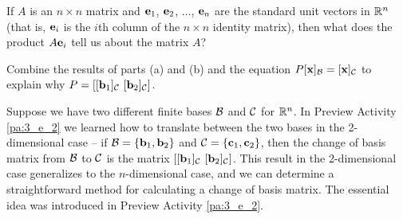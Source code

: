 \begin{pa}
	\item If $A$ is an $n \times n$ matrix and $\mathbf{e}_1$, $\mathbf{e}_2$, $\ldots$, $\mathbf{e}_n$ are the standard unit vectors in $\mathbb{R}^n$ (that is, $\mathbf{e}_i$ is the $i$th column of the $n \times n$ identity matrix), then what does the product $A \mathbf{e}_i$ tell us about the matrix $A$? 
	
	\item Combine the results of parts (a) and (b) and the equation $P[\mathbf{x}]_{\mathcal{B}} = [\mathbf{x}]_{\mathcal{C}}$ to explain why $P = [[\vb_1]_{\CC} \ [\vb_2]_{\CC}]$. 
	
		\ea
		
\ee

\end{pa}



\label{sec:mtx_cob}

Suppose we have two different finite bases $\mathcal{B}$ and $\mathcal{C}$ for $\mathbb{R}^n$. In Preview Activity \ref{pa:3_e_2} we learned how to translate between the two bases in the 2-dimensional case -- if $\mathcal{B} = \{\mathbf{b}_1, \mathbf{b}_2\}$ and $\mathcal{C} = \{\mathbf{c}_1, \mathbf{c}_2\}$, then the change of basis matrix from $\mathcal{B}$ to $\mathcal{C}$ is the matrix $[[\mathbf{b}_1]_{\mathcal{C}} \ [\mathbf{b}_2]_{\mathcal{C}}]$. This result in the 2-dimensional case generalizes to the $n$-dimensional case, and we can determine a straightforward method for calculating a change of basis matrix.  The essential idea was introduced in Preview Activity \ref{pa:3_e_2}. 

